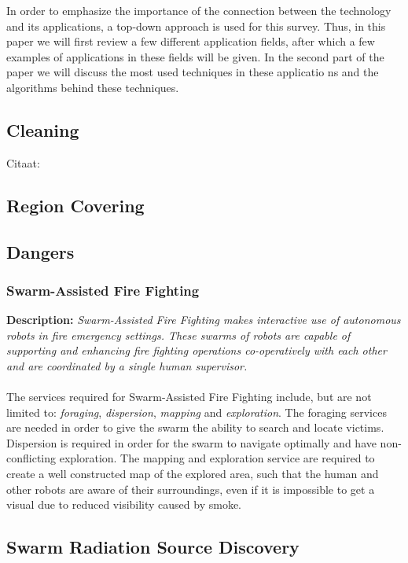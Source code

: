\documentclass[a4paper]{article}
\begin{document}
In order to emphasize the importance of the connection between the technology and its applications, a top-down approach is used for this survey. Thus,  in this paper we will first review a few different application fields, after which a few examples of applications in these fields will be given. In the second part of the paper we will discuss the most used techniques in these applicatio ns and the algorithms behind these techniques. \\

  \subsection{Cleaning}
  Citaat: \cite{wagner2008cooperative} \cite{altshuler2005swarm}
  
  \subsection{Region Covering}
  \subsection{Dangers}
  \subsubsection{Swarm-Assisted Fire Fighting}
  \textbf{Description: }\emph{Swarm-Assisted Fire Fighting makes interactive use of autonomous robots in fire emergency settings. These swarms of robots are capable of supporting and enhancing fire fighting operations co-operatively with each other and are coordinated by a single human supervisor.}\cite{Naghsh2008,Penders2011}\\\\
  The services required for Swarm-Assisted Fire Fighting include, but are not limited to: \emph{foraging}, \emph{dispersion}, \emph{mapping} and \emph{exploration}.\cite{Naghsh2008,Penders2011} The foraging services are needed in order to give the swarm the ability to search and locate victims. Dispersion is required in order for the swarm to navigate optimally and have non-conflicting exploration. The mapping and exploration service are required to create a well constructed map of the explored area, such that the human and other robots are aware of their surroundings, even if it is impossible to get a visual due to reduced visibility caused by smoke. 
  \subsection{Swarm Radiation Source Discovery}
\end{document}
